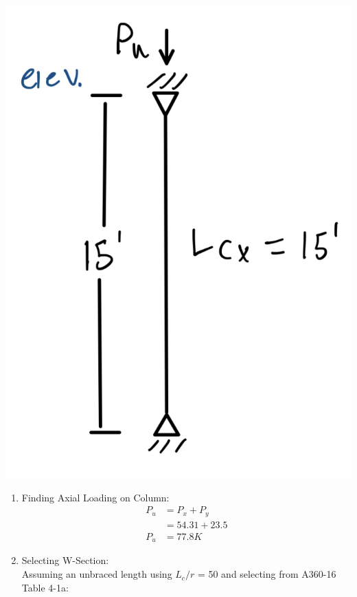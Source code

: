 \documentclass{report} %
\begin{document}
\begin{center}
    \includegraphics[scale=0.15]{RoofColumn_B7_Loads}
\end{center}
\begin{enumerate}
    \item Finding Axial Loading on Column:
        \begin{equation*}
            \begin{aligned}
                P_u &= P_x + P_y \\
                    &= 54.31 + 23.5 \\
                P_u &= 77.8K  
            \end{aligned}
        \end{equation*}
    \item Selecting W-Section:\\
        Assuming an unbraced length using $L_c/r$ = 50 and selecting from A360-16 Table 4-1a:
            \begin{center}
            \end{center}    
\end{enumerate}
\end{document}
